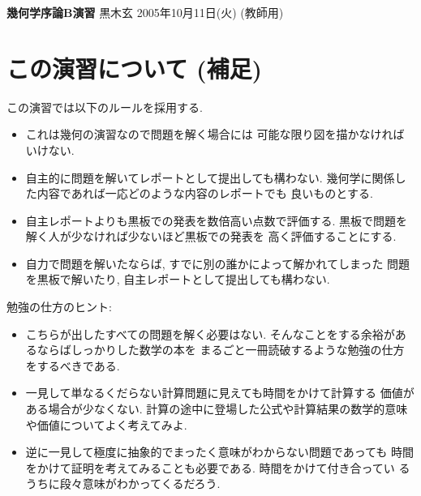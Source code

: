 \documentclass[12pt,twoside]{jarticle}
\newcommand\commentout[1]{#1}
\newcommand\commentout[1]{}
\begin{document}
\noindent
{\Large\bf 幾何学序論B演習}
\hfill
{\large 黒木玄}
\qquad
2005年10月11日(火)
\commentout{\quad (教師用)}
\tableofcontents

\section*{この演習について (補足)}

この演習では以下のルールを採用する.
\begin{itemize}
\item これは幾何の演習なので問題を解く場合には
  可能な限り図を描かなければいけない.
\item 自主的に問題を解いてレポートとして提出しても構わない.
  幾何学に関係した内容であれば一応どのような内容のレポートでも
  良いものとする.
\item 自主レポートよりも黒板での発表を数倍高い点数で評価する. 
  黒板で問題を解く人が少なければ少ないほど黒板での発表を
  高く評価することにする.
\item 自力で問題を解いたならば, すでに別の誰かによって解かれてしまった
  問題を黒板で解いたり, 自主レポートとして提出しても構わない.
\end{itemize}

勉強の仕方のヒント:
\begin{itemize}
\item こちらが出したすべての問題を解く必要はない.
  そんなことをする余裕があるならばしっかりした数学の本を
  まるごと一冊読破するような勉強の仕方をするべきである.
\item 一見して単なるくだらない計算問題に見えても時間をかけて計算する
  価値がある場合が少なくない.  
  計算の途中に登場した公式や計算結果の数学的意味
  や価値についてよく考えてみよ.
\item 逆に一見して極度に抽象的でまったく意味がわからない問題であっても
  時間をかけて証明を考えてみることも必要である. 時間をかけて付き合ってい
  るうちに段々意味がわかってくるだろう.
\end{itemize}
\end{document}
